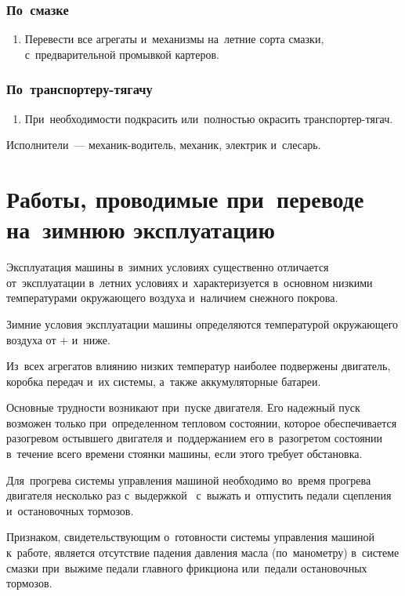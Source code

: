 \subsubsection{По~смазке}
\begin{enumerate}
    \item Перевести все агрегаты и~механизмы на~летние сорта смазки, с~предварительной промывкой картеров. 
\end{enumerate}

\subsubsection{По~транспортеру-тягачу}
\begin{enumerate}
    \item При~необходимости подкрасить или~полностью окрасить транспортер-тягач. 
\end{enumerate}

Исполнители~--- механик-водитель, механик, электрик и~слесарь.



\section{Работы, проводимые при~переводе на~зимнюю эксплуатацию} 
Эксплуатация машины в~зимних условиях существенно отличается от~эксплуатации в~летних условиях и~характеризуется в~основном низкими температурами окружающего воздуха и~наличием снежного покрова.

Зимние условия эксплуатации машины определяются температурой окружающего воздуха от + и~ниже.

Из~всех агрегатов влиянию низких температур наиболее подвержены двигатель, коробка передач и~их системы, а~также аккумуляторные батареи.

Основные трудности возникают при~пуске двигателя. Его надежный пуск возможен только при~определенном тепловом состоянии, которое обеспечивается разогревом остывшего двигателя и~поддержанием его в~разогретом состоянии в~течение всего времени стоянки машины, если этого требует обстановка.

Для~прогрева системы управления машиной необходимо во~время прогрева двигателя несколько раз с~выдержкой ~с~выжать и~отпустить педали сцепления и~остановочных тормозов.

Признаком, свидетельствующим о~готовности системы управления машиной к~работе, является отсутствие падения давления масла (по~манометру) в~системе смазки при~выжиме педали главного фрикциона или~педали остановочных \mbox{тормозов}.

